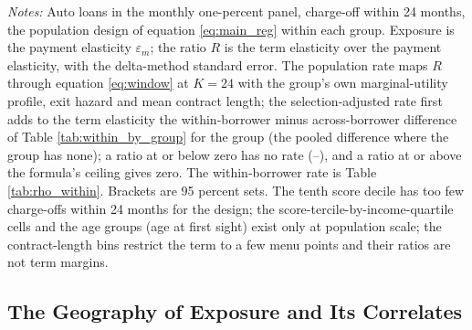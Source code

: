 \begin{table}[H]
\centering
\caption{The population design beside the within-borrower design, by group}
\label{tab:het_population}
\scriptsize
\resizebox{\textwidth}{!}{}
\vspace{0.5em}
\begin{minipage}{0.95\textwidth}
\noindent \small \textit{Notes:} Auto loans in the monthly one-percent panel, charge-off within 24 months, the population design of equation \eqref{eq:main_reg} within each group. Exposure is the payment elasticity $\varepsilon_m$; the ratio $R$ is the term elasticity over the payment elasticity, with the delta-method standard error. The population rate maps $R$ through equation \eqref{eq:window} at $K = 24$ with the group's own marginal-utility profile, exit hazard and mean contract length; the selection-adjusted rate first adds to the term elasticity the within-borrower minus across-borrower difference of Table \ref{tab:within_by_group} for the group (the pooled difference where the group has none); a ratio at or below zero has no rate (--), and a ratio at or above the formula's ceiling gives zero. The within-borrower rate is Table \ref{tab:rho_within}. Brackets are 95 percent sets. The tenth score decile has too few charge-offs within 24 months for the design; the score-tercile-by-income-quartile cells and the age groups (age at first sight) exist only at population scale; the contract-length bins restrict the term to a few menu points and their ratios are not term margins.
\end{minipage}
\end{table}

\subsection{The Geography of Exposure and Its Correlates}\label{sec:geo_correlates}


